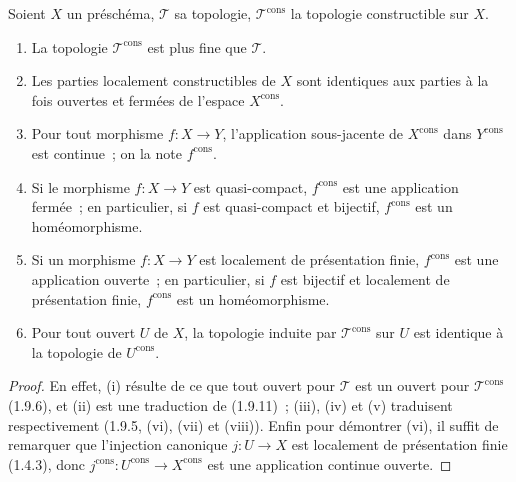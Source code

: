 \begin{proposition}[1.9.14]
\label{IV.1.9.14-fr}
Soient $X$ un préschéma, $\mathscr T$ sa topologie,
$\mathscr T^{\mathrm{cons}}$ la topologie constructible sur $X$.
\begin{enumerate}
  \item[\textup{(i)}] La topologie $\mathscr T^{\mathrm{cons}}$ est plus fine que
  $\mathscr T$.
  \item[\textup{(ii)}] Les parties localement constructibles de $X$ sont identiques
  aux parties à la fois ouvertes et fermées de l'espace $X^{\mathrm{cons}}$.
  \item[\textup{(iii)}] Pour tout morphisme $f:X\to Y$, l'application sous-jacente de
  $X^{\mathrm{cons}}$ dans $Y^{\mathrm{cons}}$ est continue~; on la note
  $f^{\mathrm{cons}}$.
  \item[\textup{(iv)}] Si le morphisme $f:X\to Y$ est quasi-compact,
  $f^{\mathrm{cons}}$ est une application fermée~; en particulier, si $f$
  est quasi-compact et bijectif, $f^{\mathrm{cons}}$ est un homéomorphisme.
  \item[\textup{(v)}] Si un morphisme $f:X\to Y$ est localement de présentation
  finie, $f^{\mathrm{cons}}$ est une application ouverte~; en particulier,
  si $f$ est bijectif et localement de présentation finie,
  $f^{\mathrm{cons}}$ est un homéomorphisme.
  \item[\textup{(vi)}] Pour tout ouvert $U$ de $X$, la topologie induite par
  $\mathscr T^{\mathrm{cons}}$ sur $U$ est identique à la topologie de
  $U^{\mathrm{cons}}$.
\end{enumerate}
\end{proposition}

\begin{proof}
En effet, (i) résulte de ce que tout ouvert pour $\mathscr T$ est un ouvert
pour $\mathscr T^{\mathrm{cons}}$ (1.9.6), et (ii) est une traduction de
(1.9.11)~; (iii), (iv) et (v) traduisent respectivement (1.9.5, (vi), (vii)
et (viii)). Enfin pour démontrer (vi), il suffit de remarquer que l'injection
canonique $j:U\to X$ est localement de présentation finie (1.4.3), donc
$j^{\mathrm{cons}}:U^{\mathrm{cons}}\to X^{\mathrm{cons}}$ est une
application continue ouverte.
\end{proof}

